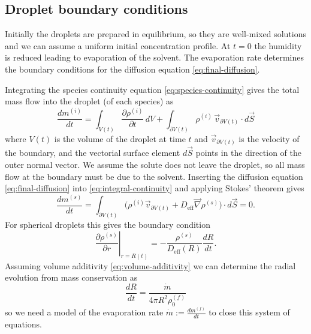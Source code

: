 \documentclass[11pt,twoside]{report}
\begin{document}
\subsection{Droplet boundary conditions}

Initially the droplets are prepared in equilibrium, so they are well-mixed solutions and we can assume a uniform initial concentration profile.
At $t=0$ the humidity is reduced leading to evaporation of the solvent.
The evaporation rate determines the boundary conditions for the diffusion equation \eqref{eq:final-diffusion}.

Integrating the species continuity equation \eqref{eq:species-continuity} gives the total mass flow into the droplet (of each species) as
\begin{equation}\label{eq:integral-continuity}
  \frac{d m^{(i)}}{dt} =
  \int_{V(t)} \frac{\partial \rho^{(i)}}{\partial t} \, d V +
  \int_{\partial V(t)} \rho^{(i)} \, \vec{v}_{\partial V(t)} \cdot d\vec{S}
\end{equation}
where $V(t)$ is the volume of the droplet at time $t$ and $\vec{v}_{\partial V(t)}$ is the velocity of the boundary, and the vectorial surface element $d\vec{S}$ points in the direction of the outer normal vector.
We assume the solute does not leave the droplet, so all mass flow at the boundary must be due to the solvent.
Inserting the diffusion equation \eqref{eq:final-diffusion} into \eqref{eq:integral-continuity} and applying Stokes' theorem gives
\begin{equation}
  \frac{d m^{(s)}}{dt}
  =
  \int_{\partial V(t)}
  \Big(
  \rho^{(i)} \vec{v}_{\partial V(t)} +
  D_\mathrm{eff} \vec{\nabla} \rho^{(s)}
  \Big)
  \cdot d\vec{S}
  = 0.
\end{equation}
For spherical droplets this gives the boundary condition
\begin{equation}
  \left. \frac{\partial \rho^{(s)}}{\partial r} \right|_{r=R(t)}
  =
  -
  \frac{\rho^{(s)}}{D_\mathrm{eff}(R)}
  \frac{dR}{dt}.
\end{equation}
Assuming volume additivity \eqref{eq:volume-additivity} we can determine the radial evolution from mass conservation as
\begin{equation}\label{eq:radial-evolution}
  \frac{dR}{dt}
  =
  \frac{\dot{m}}{4\pi R^2 \rho^{(f)}_0}
\end{equation}
so we need a model of the evaporation rate $\dot{m} := \tfrac{dm^{(f)}}{dt}$ to close this system of equations.
\end{document}

